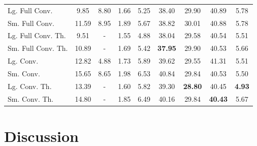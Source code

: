 \documentclass{article} %
\begin{document}
\begin{table}[t]
\begin{center}
\begin{tabular}{lcccccccc}
      Lg. Full Conv. & 9.85 & 8.80 & 1.66 & 5.25 & 38.40 & 29.90 & 40.89 & 5.78 \\
      Sm. Full Conv. & 11.59 & 8.95 & 1.89 & 5.67 & 38.82 & 30.01 & 40.88 & 5.78 \\
      Lg. Full Conv. Th. & 9.51 & - & 1.55 & 4.88 & 38.04 & 29.58 & 40.54 & 5.51 \\
      Sm. Full Conv. Th. & 10.89 & - & 1.69 & 5.42 & \color{blue}\textbf{37.95} & 29.90 & 40.53 & 5.66 \\
      Lg. Conv. & 12.82 & 4.88 & 1.73 & 5.89 & 39.62 & 29.55 & 41.31 & 5.51 \\
      Sm. Conv. & 15.65 & 8.65 & 1.98 & 6.53 & 40.84 & 29.84 & 40.53 & 5.50 \\
      Lg. Conv. Th. & 13.39 & - & 1.60 & 5.82 & 39.30 & \color{blue}\textbf{28.80} & 40.45 & \color{blue}\textbf{4.93} \\
      Sm. Conv. Th. & 14.80 & - & 1.85 & 6.49 & 40.16 & 29.84 & \color{blue}\textbf{40.43} & 5.67 \\
    \end{tabular}
  \end{center}
\end{table}

\section{Discussion}
\end{document}
